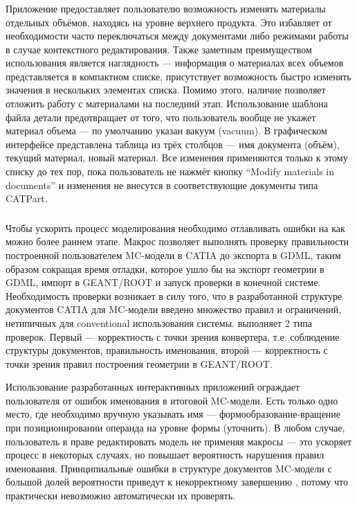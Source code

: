 \subsubsection{}\label{sec:MaterialsManager}

Приложение  предоставляет пользователю возможность изменять материалы отдельных объёмов, находясь на уровне верхнего продукта. Это избавляет от необходимости часто переключаться между документами либо режимами работы в случае контекстного редактирования. Также заметным преимуществом использования  является наглядность --- информация о материалах всех объемов представляется в компактном списке, присутствует возможность быстро изменять значения в нескольких элементах списка. Помимо этого, наличие  позволяет отложить работу с материалами на последний этап. Использование шаблона файла детали предотвращает от того, что пользователь вообще не укажет материал объема --- по умолчанию указан вакуум (vacuum). В графическом интерфейсе  представлена таблица из трёх столбцов --- имя документа (объём), текущий материал, новый материал. Все изменения применяются только к этому списку до тех пор, пока пользователь не нажмёт кнопку ``Modify materials in documents'' и изменения не внесутся в соответствующие документы типа CATPart.

\subsubsection{}\label{sec:Checker}

Чтобы ускорить процесс моделирования необходимо отлавливать ошибки на как можно более раннем этапе. Макрос  позволяет выполнять проверку правильности построенной пользователем MC-модели в CATIA до экспорта в GDML, таким образом сокращая время отладки, которое ушло бы на экспорт геометрии в GDML, импорт в GEANT/ROOT и запуск проверки в конечной системе. Необходимость проверки возникает в силу того, что в разработанной структуре документов CATIA для MC-модели введено множество правил и ограничений, нетипичных для \todo conventional использования системы.  выполняет 2 типа проверок. Первый --- корректность с точки зрения конвертера, т.е. соблюдение структуры документов, правильность именования, второй --- корректность с точки зрения правил построения геометрии в GEANT/ROOT.

Использование разработанных интерактивных приложений ограждает пользователя от ошибок именования в итоговой MC-модели. Есть только одно место, где необходимо вручную указывать имя --- формообразование-вращение при позиционировании операнда на уровне формы (\todo уточнить). В любом случае, пользователь в праве редактировать модель не применяя макросы --- это ускоряет процесс в некоторых случаях, но повышает вероятность нарушения правил именования. Принципиальные ошибки в структуре документов MC-модели с большой долей вероятности приведут к некорректному завершению , потому что практически невозможно автоматически их проверять.

